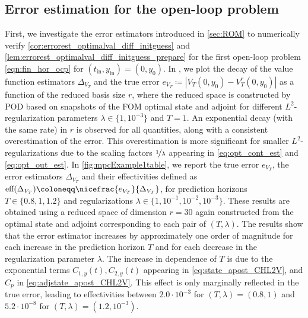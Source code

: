 \documentclass{m2an}
\newcommand{\tint}{t_{\mathrm{in}}}
\newcommand{\yint}{y_{\mathrm{in}}}
\begin{document}
\subsection{Error estimation for the open-loop problem}\label{subsec:openloop}
%
First, we investigate the error estimators introduced in \cref{sec:ROM} to numerically verify \cref{cor:errorest_optimalval_diff_initguess} and \cref{lem:errorest_optimalval_diff_initguess_prepare} for the first open-loop problem \eqref{eqn:fin_hor_ocp} for $(\tint,\yint)=(0,y_0)$. In , we plot the decay of the value function estimators $\Delta_{V_T}$ and the true error $e_{V_T}\coloneqq|V_T(0,y_0)-V_T^r(0,y_0)|$ as a function of the reduced basis size $r$, where the reduced space is constructed by POD based on snapshots of the FOM optimal state and adjoint for different $L^2$-regularization parameters $\lambda \in \{1, 10^{-3} \}$ and $T=1$. An exponential decay (with the same rate) in $r$ is observed for all quantities, along with a consistent overestimation of the error. This overestimation is more significant for smaller $L^2$-regularizations due to the scaling factors $\nicefrac{1}{\lambda}$ appearing in \cref{eq:opt_cont_est} and \cref{eq:opt_out_est}. In \cref{fig:mpcExample1table}, we report the true error $e_{V_T}$, the error estimators $\Delta_{V_T}$ and their effectivities defined as $\text{eff}(\Delta_{V_T})\coloneqq \nicefrac{e_{V_T}}{\Delta_{V_T}}$, for prediction horizons $T\in \{ 0.8,1,1.2\}$ and regularizations $\lambda \in \{1, 10^{-1}, 10^{-2}, 10^{-3} \}$. These results are obtained using a reduced space of dimension $r=30$ again constructed from the optimal state and adjoint corresponding to each pair of $(T,\lambda)$. The results show that the error estimator increases by approximately one order of magnitude for each increase in the prediction horizon \( T \) and for each decrease in the regularization parameter \( \lambda \). The increase in dependence of $T$ is due to the exponential terms $C_{1,y}(t), C_{2,y}(t)$  appearing in \eqref{eq:state_apost_CHL2V}, and $C_p$ in \eqref{eq:adjstate_apost_CHL2V}. This effect is only marginally reflected in the true error, leading to effectivities between \( 2.0\cdot 10^{-3} \) for $(T,\lambda)=(0.8,1)$ and \( 5.2 \cdot 10^{-8} \) for $(T,\lambda)=(1.2,10^{-3})$. 
\end{document}
